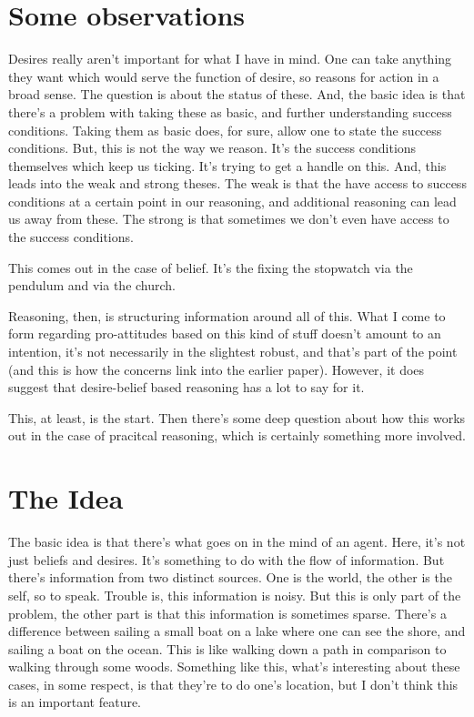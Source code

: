\documentclass[10pt]{article}
\begin{document}
\section{Some observations}
\label{sec:some-observations}

Desires really aren't important for what I have in mind.
One can take anything they want which would serve the function of desire, so reasons for action in a broad sense.
The question is about the status of these.
And, the basic idea is that there's a problem with taking these as basic, and further understanding success conditions.
Taking them as basic does, for sure, allow one to state the success conditions.
But, this is not the way we reason.
It's the success conditions themselves which keep us ticking.
It's trying to get a handle on this.
And, this leads into the weak and strong theses.
The weak is that the have access to success conditions at a certain point in our reasoning, and additional reasoning can lead us away from these.
The strong is that sometimes we don't even have access to the success conditions.

This comes out in the case of belief.
It's the fixing the stopwatch via the pendulum and via the church.

Reasoning, then, is structuring information around all of this.
What I come to form regarding pro-attitudes based on this kind of stuff doesn't amount to an intention, it's not necessarily in the slightest robust, and that's part of the point (and this is how the concerns link into the earlier paper).
However, it does suggest that desire-belief based reasoning has a lot to say for it.

This, at least, is the start.
Then there's some deep question about how this works out in the case of pracitcal reasoning, which is certainly something more involved.

\section{The Idea}
\label{sec:idea}

The basic idea is that there's what goes on in the mind of an agent.
Here, it's not just beliefs and desires.
It's something to do with the flow of information.
But there's information from two distinct sources.
One is the world, the other is the self, so to speak.
Trouble is, this information is noisy.
But this is only part of the problem, the other part is that this information is sometimes sparse.
There's a difference between sailing a small boat on a lake where one can see the shore, and sailing a boat on the ocean.
This is like walking down a path in comparison to walking through some woods.
Something like this, what's interesting about these cases, in some respect, is that they're to do one's location, but I don't think this is an important feature.
\end{document}
